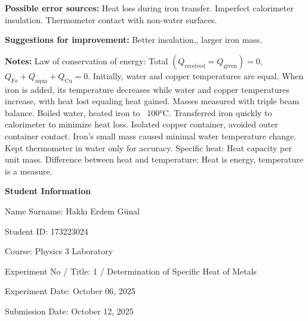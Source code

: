 \documentclass[12pt, a4paper]{article}
\begin{document}
\textbf{Possible error sources:}  
Heat loss during iron transfer.  
Imperfect calorimeter insulation.  
Thermometer contact with non-water surfaces.

\textbf{Suggestions for improvement:} Better insulation,, larger iron mass.

\textbf{Notes:}  
Law of conservation of energy: Total $(Q_{\text{received}} = Q_{\text{given}}) = 0$, $Q_{\text{Fe}} + Q_{\text{aqua}} + Q_{\text{Cu}} = 0$.  
Initially, water and copper temperatures are equal.  
When iron is added, its temperature decreases while water and copper temperatures increase, with heat lost equaling heat gained.  
Masses measured with triple beam balance.  
Boiled water, heated iron to ~100°C.  
Transferred iron quickly to calorimeter to minimize heat loss.  
Isolated copper container, avoided outer container contact.  
Iron's small mass caused minimal water temperature change.  
Kept thermometer in water only for accuracy.  
Specific heat: Heat capacity per unit mass.  
Difference between heat and temperature: Heat is energy, temperature is a measure.

\newpage

\textbf{Student Information}

Name Surname: Hakkı Erdem Günal

Student ID: 173223024

Course: Physics 3 Laboratory

Experiment No / Title: 1 / Determination of Specific Heat of Metals

Experiment Date: October 06, 2025

Submission Date: October 12, 2025
\end{document}
